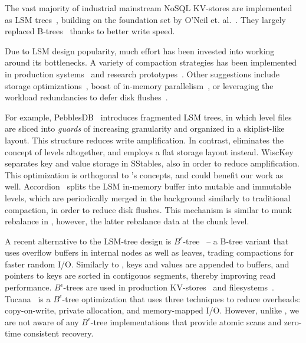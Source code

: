 

The vast majority of industrial mainstream NoSQL KV-stores are  implemented as LSM trees~\cite{hbase, 
RocksDB, scylladb, Bigtable2008, cassandra2010}, building on the foundation set by O'Neil 
et. al.~\cite{O'Neil1996, Muth1998}. They largely replaced B-trees~\cite{Knuth:1997}
thanks to better write speed. 

Due to LSM design popularity, much effort has been invested into working around its bottlenecks.
A variety of compaction strategies has been implemented in production systems~\cite{CallaghanCompaction, 
ScyllaCompaction} and research prototypes~\cite{triad, PebblesDB}. Other suggestions include storage
optimizations~\cite{WiscKey, PebblesDB}, boost of in-memory parallelism~\cite{clsm2015, scylladb}, or leveraging 
the workload redundancies to defer disk flushes~\cite{triad, accordion}. 

For example, PebblesDB~\cite{PebblesDB} introduces fragmented LSM trees, in which level files are 
sliced into {\em guards\/} of increasing granularity and organized in a skiplist-like layout. This structure 
reduces write amplification. In contrast, \sys\/ eliminates the concept of levels altogether, 
and employs a flat storage layout instead. WiscKey~\cite{WiscKey} separates key and value storage 
in SStables, also in order to reduce amplification. This optimization is orthogonal to \sys's concepts,
and could benefit our work as well. Accordion~\cite{accordion} splits the LSM in-memory buffer into mutable 
and immutable levels, which are periodically merged in the background similarly to traditional compaction, 
in order to reduce disk flushes. This mechanism is similar to munk rebalance in \sys, 
however, the latter rebalance data at the chunk level.

A recent alternative to the LSM-tree design is $B^{\epsilon}$-tree~\cite{Brodal:2003:LBE:644108.644201} -- a 
B-tree variant that uses overflow buffers in internal nodes as well as leaves, trading compactions for faster random I/O. 
Similarly to \sys, keys and values are appended to buffers, and pointers to keys are sorted in contigouos segments, 
thereby improving read performance. $B^{\epsilon}$-trees are used in production KV-stores~\cite{TokuDB} and filesystems~\cite{BetrFS}. 
Tucana~\cite{tucana} is a $B^{\epsilon}$-tree optimization that uses three techniques to reduce overheads: copy-on-write, private allocation, 
and memory-mapped I/O. However, unlike \sys, we are not aware of any $B^{\epsilon}$-tree implementations that provide atomic scans 
and zero-time consistent recovery. 

